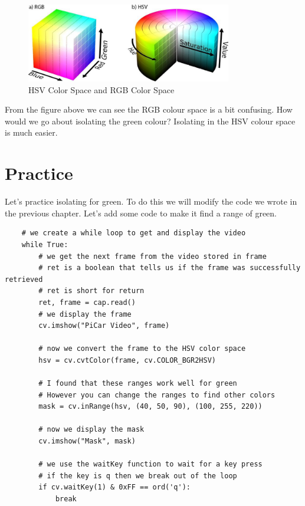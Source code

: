\documentclass[12pt]{report}
\begin{document}
\begin{figure}[htbp]
    \centering
    \includegraphics[width=0.8\textwidth]{HSVVSRGB.jpeg}
    \caption{HSV Color Space and RGB Color Space}
    \label{fig:HSVVSRGB}
\end{figure}

From the figure above we can see the RGB colour space is a bit confusing. How would we go about isolating the green colour? 
Isolating in the HSV colour space is much easier.

\section{Practice}
Let's practice isolating for green. To do this we will modify the code we wrote in the previous chapter. Let's add some code to make it find a range of green.

\begin{verbatim}
    # we create a while loop to get and display the video
    while True:
        # we get the next frame from the video stored in frame
        # ret is a boolean that tells us if the frame was successfully retrieved
        # ret is short for return
        ret, frame = cap.read()
        # we display the frame
        cv.imshow("PiCar Video", frame)

        # now we convert the frame to the HSV color space
        hsv = cv.cvtColor(frame, cv.COLOR_BGR2HSV)

        # I found that these ranges work well for green
        # However you can change the ranges to find other colors
        mask = cv.inRange(hsv, (40, 50, 90), (100, 255, 220))

        # now we display the mask
        cv.imshow("Mask", mask)

        # we use the waitKey function to wait for a key press
        # if the key is q then we break out of the loop
        if cv.waitKey(1) & 0xFF == ord('q'):
            break

\end{verbatim}
\end{document}
